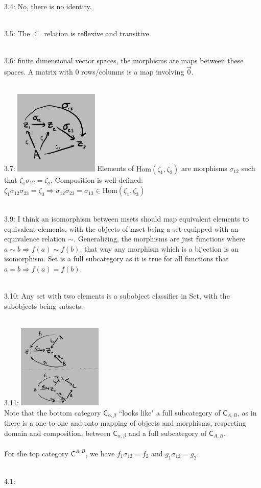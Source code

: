 \documentclass{article}
\newcommand{\hsp}[1][5]{\hspace{0.#1 cm}}
\newcommand{\imp}{\Rightarrow}
\newcommand{\cat}{\mathsf{C}}
\newcommand{\HOM}{\text{Hom}}
\begin{document}
\begin{flushleft}
3.4: No, there is no identity.\\\ 

3.5: The $\subseteq$ relation is reflexive and transitive.\\\ 

3.6: finite dimensional vector spaces, the morphisms are maps between these spaces. A matrix with 0 rows/columns is a map involving $\vec{0}$.\\\ 

3.7: \includegraphics[height=4cm]{alg0-3-7} Elements of $\HOM(\zeta_1, \zeta_2)$ are morphisms $\sigma_{12}$ such that $\zeta_1\sigma_{12} = \zeta_2$. Composition is well-defined: $\zeta_1\sigma_{12}\sigma_{23} = \zeta_3 \imp \sigma_{12}\sigma_{23} = \sigma_{13} \in \HOM(\zeta_1,\zeta_3)$\\\ 

3.9: I think an isomorphism between msets should map equivalent elements to equivalent elements, with the objects of mset being a set equipped with an equivalence relation $\sim$. Generalizing, the morphisms are just functions where $a\sim b \imp f(a) \sim f(b)$, that way any morphism which is a bijection is an isomorphism. Set is a full subcategory as it is true for all functions that $a=b \imp f(a) = f(b)$.\\\ 

3.10: Any set with two elements is a subobject classifier in \textsf{Set}, with the subobjects being subsets.\\\  

3.11: \includegraphics[height=4cm]{alg0-3-11}\\\hsp Note that the bottom category $\cat_{\alpha, \beta}$ ``looks like" a full subcategory of $\cat_{A,B}$, as in there is a one-to-one and onto mapping of objects and morphisms, respecting domain and composition, between $\cat_{\alpha, \beta}$ and a full subcategory of $\cat_{A,B}$.\\\ \\\hsp
For the top category $\cat^{A,B}$, we have $f_1\sigma_{12} = f_2$ and $g_1 \sigma_{12} = g_2$. \\\ 

4.1:
\end{flushleft}
\end{document}
